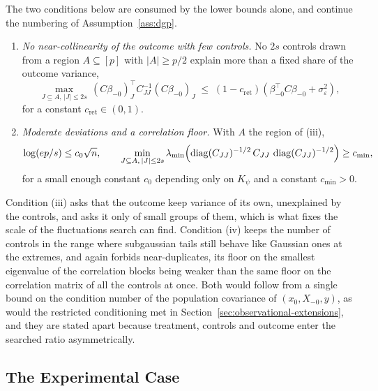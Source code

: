 \begin{assumption}
\label{ass:lower}
The two conditions below are consumed by the lower bounds alone, and
continue the numbering of Assumption~\ref{ass:dgp}.
\begin{enumerate}
\item[(iii)] \emph{No near-collinearity of the outcome with few controls.}
No $2s$ controls drawn from a region $A \subseteq [p]$ with
$|A| \ge p/2$ explain more than a fixed share of the outcome variance,
\begin{equation*}
        \max_{J \subseteq A,\, |J| \le 2s}\,
        (C\beta_{-0})_J^\top C_{JJ}^{-1} (C\beta_{-0})_J
        \;\le\;
        (1 - c_{\mathrm{ret}})
        \left( \beta_{-0}^\top C \beta_{-0} + \sigma_\varepsilon^2 \right),
\end{equation*}
for a constant $c_{\mathrm{ret}} \in (0, 1)$.
\item[(iv)] \emph{Moderate deviations and a correlation floor.} With $A$
the region of (iii),
\begin{equation*}
        \log(ep/s) \le c_0 \sqrt n,
        \qquad
        \min_{J \subseteq A,\, |J| \le 2s}
        \lambda_{\min}\!\left( \operatorname{diag}(C_{JJ})^{-1/2}\, C_{JJ}\,
        \operatorname{diag}(C_{JJ})^{-1/2} \right)
        \ge c_{\min},
\end{equation*}
for a small enough constant $c_0$ depending only on $K_\psi$ and a
constant $c_{\min} > 0$.
\end{enumerate}
\end{assumption}

Condition (iii) asks that the outcome keep variance of its own,
unexplained by the controls, and asks it only of small groups of them,
which is what fixes the scale of the fluctuations search can find.
Condition (iv) keeps the number of controls in the range where
subgaussian tails still behave like Gaussian ones at the extremes, and
again forbids near-duplicates, its floor on the smallest eigenvalue of
the correlation blocks being weaker than the same floor on the
correlation matrix of all the controls at once. Both would follow from a
single bound on the condition number of the population covariance of
$(x_0, X_{-0}, y)$, as would the restricted conditioning met in
Section~\ref{sec:observational-extensions}, and they are stated apart
because treatment, controls and outcome enter the searched ratio
asymmetrically.


\subsection{The Experimental Case}
\label{sec:sparse-search}


